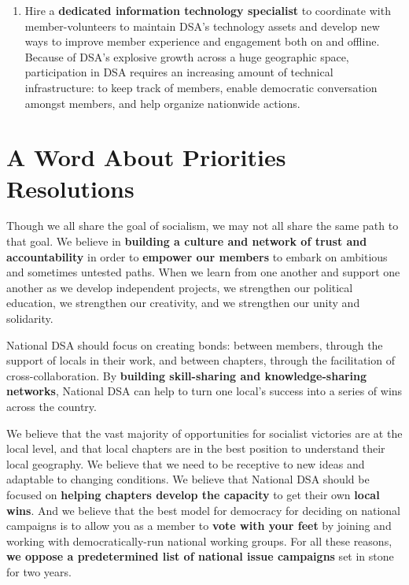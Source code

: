 \documentclass[10pt]{memoir}
\begin{document}
\begin{enumerate}
\item{Hire a \textbf{dedicated information technology specialist} to coordinate with member-volunteers to maintain DSA’s technology assets and develop new ways to improve member experience and engagement both on and offline. Because of DSA’s explosive growth across a huge geographic space, participation in DSA requires an increasing amount of technical infrastructure: to keep track of members, enable democratic conversation amongst members, and help organize nationwide actions.}
\end{enumerate}


\section*{A Word About Priorities Resolutions}

Though we all share the goal of socialism, we may not all share the same path to that goal. We believe in \textbf{building a culture and network of trust and accountability} in order to \textbf{empower our members} to embark on ambitious and sometimes untested paths. When we learn from one another and support one another as we develop independent projects, we strengthen our political education, we strengthen our creativity, and we strengthen our unity and solidarity. 

National DSA should focus on creating bonds: between members, through the support of locals in their work, and between chapters, through the facilitation of cross-collaboration. By \textbf{building skill-sharing and knowledge-sharing networks}, National DSA can help to turn one local's success into a series of wins across the country. 

We believe that the vast majority of opportunities for socialist victories are at the local level, and that local chapters are in the best position to understand their local geography. We believe that we need to be receptive to new ideas and adaptable to changing conditions. We believe that National DSA should be focused on \textbf{helping chapters develop the capacity} to get their own \textbf{local wins}. And we believe that the best model for democracy for deciding on national campaigns is to allow you as a member to \textbf{vote with your feet} by joining and working with democratically-run national working groups. For all these reasons, \linebreak\textbf{we oppose a predetermined list of national issue campaigns} set in stone for two years.
\end{document}
